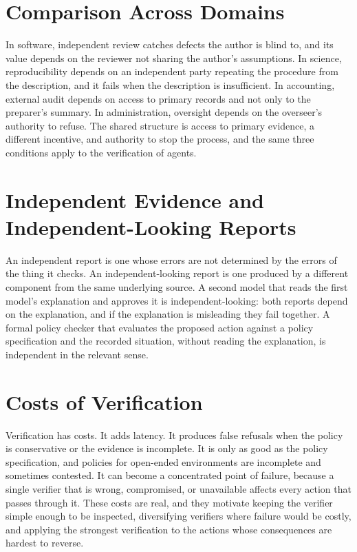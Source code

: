 \section{Comparison Across Domains}

In software, independent review catches defects the author is blind to, and its value depends on the reviewer not sharing the author's assumptions. In science, reproducibility depends on an independent party repeating the procedure from the description, and it fails when the description is insufficient. In accounting, external audit depends on access to primary records and not only to the preparer's summary. In administration, oversight depends on the overseer's authority to refuse. The shared structure is access to primary evidence, a different incentive, and authority to stop the process, and the same three conditions apply to the verification of agents.

\section{Independent Evidence and Independent-Looking Reports}

An independent report is one whose errors are not determined by the errors of the thing it checks. An independent-looking report is one produced by a different component from the same underlying source. A second model that reads the first model's explanation and approves it is independent-looking: both reports depend on the explanation, and if the explanation is misleading they fail together. A formal policy checker that evaluates the proposed action against a policy specification and the recorded situation, without reading the explanation, is independent in the relevant sense.

\section{Costs of Verification}

Verification has costs. It adds latency. It produces false refusals when the policy is conservative or the evidence is incomplete. It is only as good as the policy specification, and policies for open-ended environments are incomplete and sometimes contested. It can become a concentrated point of failure, because a single verifier that is wrong, compromised, or unavailable affects every action that passes through it. These costs are real, and they motivate keeping the verifier simple enough to be inspected, diversifying verifiers where failure would be costly, and applying the strongest verification to the actions whose consequences are hardest to reverse.

